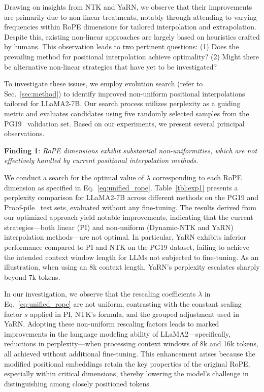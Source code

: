 Drawing on insights from NTK and YaRN, we observe that their improvements are primarily due to non-linear treatments, notably through attending to varying frequencies within RoPE dimensions for tailored interpolation and extrapolation. Despite this, existing non-linear approaches are largely based on heuristics crafted by humans. This observation leads to two pertinent questions: (1) Does the prevailing method for positional interpolation achieve optimality? (2) Might there be alternative non-linear strategies that have yet to be investigated?

To investigate these issues, we employ evolution search (refer to Sec.~\ref{sec:method}) to identify improved non-uniform positional interpolations tailored for LLaMA2-7B. Our search process utilizes perplexity as a guiding metric and evaluates candidates using five randomly selected samples from the PG19~\cite{pg19} validation set. Based on our experiments, we present several principal observations.

\textbf{Finding 1}: \textit{RoPE dimensions exhibit substantial non-uniformities, which are not effectively handled by current positional interpolation methods.}

We conduct a search for the optimal value of $\lambda$ corresponding to each RoPE dimension as specified in Eq.~\ref{eq:unified_rope}. Table~\ref{tbl:exp1} presents a perplexity comparison for LLaMA2-7B across different methods on the PG19 and Proof-pile~\cite{proof-pile} test sets, evaluated without any fine-tuning. The results derived from our optimized approach yield notable improvements, indicating that the current strategies—both linear (PI) and non-uniform (Dynamic-NTK and YaRN) interpolation methods—are not optimal. In particular, YaRN exhibits inferior performance compared to PI and NTK on the PG19 dataset, failing to achieve the intended context window length for LLMs not subjected to fine-tuning. As an illustration, when using an 8k context length, YaRN's perplexity escalates sharply beyond 7k tokens.

In our investigation, we observe that the rescaling coefficients $\lambda$ in Eq.~\ref{eq:unified_rope} are not uniform, contrasting with the constant scaling factor $s$ applied in PI, NTK’s formula, and the grouped adjustment used in YaRN. Adopting these non-uniform rescaling factors leads to marked improvements in the language modeling ability of LLaMA2—specifically, reductions in perplexity—when processing context windows of 8k and 16k tokens, all achieved without additional fine-tuning. This enhancement arises because the modified positional embeddings retain the key properties of the original RoPE, especially within critical dimensions, thereby lowering the model's challenge in distinguishing among closely positioned tokens.

